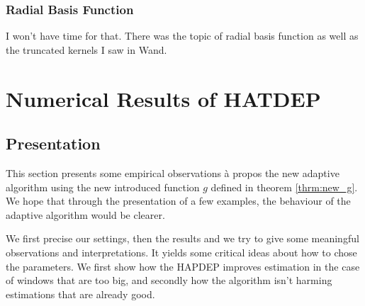 \documentclass[11pt]{book}
\begin{document}
\subsection{Radial Basis Function}

I won't have time for that. There was the topic of radial basis function as well as the truncated kernels I saw in Wand. 





















\chapter{Numerical Results of HATDEP}

\section{Presentation}
This section presents some empirical observations à propos the new adaptive algorithm using the new introduced function $g$ defined in theorem \ref{thrm:new_g}. We hope that through the presentation of a few examples, the behaviour of the adaptive algorithm would be clearer. 

We first precise our settings, then the results and we try to give some meaningful observations and interpretations. It yields some critical ideas about how to chose the parameters. We first show how the HAPDEP improves estimation in the case of windows that are too big, and secondly how the algorithm isn't harming estimations that are already good.
\end{document}
